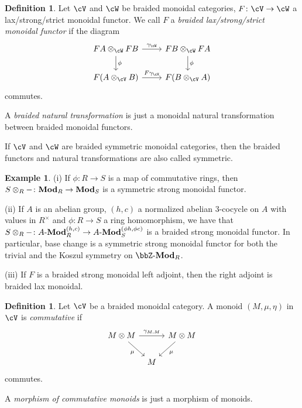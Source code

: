 \documentclass[a4paper,11pt,oneside,openany]{scrbook}
\newcommand{\catname}[1]{{\normalfont\textbf{#1}}}
\newcommand{\Mod}{\catname{Mod}}
\theoremstyle{definition}
\theoremstyle{definition}
\newtheorem{defn}[thm]{Definition} %
\newtheorem{exmp}[thm]{Example}
\begin{document}
\begin{defn}
    Let $\cV$ and $\cW$ be braided monoidal categories, $F\colon\cV\rightarrow\cW$ a lax/strong/strict monoidal functor. We call $F$ a \emph{braided lax/strong/strict monoidal functor} if the diagram
    \[
    \begin{tikzcd}
        FA\otimes_\cW FB\ar[r, "\gamma_\cW"]\ar[d, "\phi"]
        & FB\otimes_\cW FA\ar[d, "\phi"] \\
        F(A\otimes_\cV B)\ar[r, "F\gamma_\cV"]
        & F(B\otimes_\cV A)
    \end{tikzcd}
    \]
    commutes.
    
    A \emph{braided natural transformation} is just a monoidal natural transformation between braided monoidal functors.
    
    If $\cV$ and $\cW$ are braided symmetric monoidal categories, then the braided functors and natural transformations are also called symmetric.
\end{defn}

\begin{exmp}
\item[(i)] If $\phi\colon R\rightarrow S$ is a map of commutative rings, then $S\otimes_R-\colon\Mod_R\rightarrow\Mod_S$ is a symmetric strong monoidal functor.

\item[(ii)] If $A$ is an abelian group, $(h,c)$ a normalized abelian 3-cocycle on $A$ with values in $R^\times$ and $\phi\colon R\rightarrow S$ a ring homomorphism, we have that $S\otimes_R-\colon A\text{-}\Mod_R^{(h,c)}\rightarrow A\text{-}\Mod_S^{(\phi h,\phi c)}$ is a braided strong monoidal functor. In particular, base change is a symmetric strong monoidal functor for both the trivial and the Koszul symmetry on $\bbZ\text{-}\Mod_R$.

\item[(iii)] If $F$ is a braided strong monoidal left adjoint, then the right adjoint is braided lax monoidal.
\end{exmp}

\begin{defn}
    Let $\cV$ be a braided monoidal category. A monoid $(M,\mu,\eta)$ in $\cV$ is \emph{commutative} if
    \[
    \begin{tikzcd}[column sep=tiny]
        M\otimes M\ar[rr, "\gamma_{M,M}"]\ar[dr, swap, "\mu"]
        && M\otimes M\ar[dl, "\mu"] \\
        & M
    \end{tikzcd}
    \]
    commutes.
    
    A \emph{morphism of commutative monoids} is just a morphism of monoids.
\end{defn}
\end{document}
